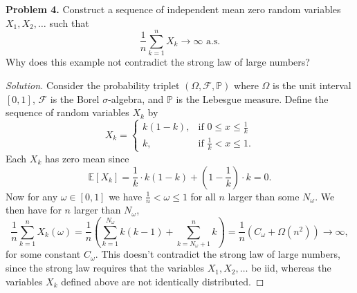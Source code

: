 \documentclass[11pt,letterpaper]{report}
\newcommand{\mcal}[1]{\mathcal{#1}}
\newcommand{\E}{\mathbb{E}}
\newcommand{\Prob}{\mathbb{P}}
\newenvironment{solution}
{\begin{proof}[Solution]}
{\end{proof}}
\begin{document}
\noindent\textbf{Problem 4. }
Construct a sequence of independent mean zero random variables $X_1, X_2, \ldots$ such that
\[
\frac{1}{n}\sum_{k=1}^nX_k\to \infty\text{ a.s.}
\]
Why does this example not contradict the strong law of large numbers?
\begin{solution}
	Consider the probability triplet $(\Omega, \mcal{F}, \Prob)$ where $\Omega$ is the unit interval $[0,1]$, $\mcal{F}$ is the Borel $\sigma$-algebra, and $\Prob$ is the Lebesgue measure. Define the sequence of random variables $X_k$ by
	\[
	X_k = \begin{cases}
		k(1-k),&\text{if }0\leq x\leq \frac{1}{k}\\
		k,&\text{if }\frac{1}{k}<x\leq 1.
	\end{cases}
	\]
	Each $X_k$ has zero mean since
	\[
	\E[X_k] = \frac{1}{k}\cdot k(1-k) + \left(1 - \frac{1}{k}\right)\cdot k = 0.
	\]
	Now for any $\omega\in [0,1]$ we have $\frac{1}{n}< \omega \leq 1$ for all $n$ larger than some $N_\omega$. We then have for $n$ larger than $N_\omega$,
	\[
	\frac{1}{n}\sum_{k=1}^n X_k(\omega) = \frac{1}{n}\left(\sum_{k=1}^{N_\omega}k(k-1) + \sum_{k=N_\omega+1}^nk\right) = \frac{1}{n}(C_\omega + \Omega(n^2)) \to \infty,
	\]
	for some constant $C_\omega$. This doesn't contradict the strong law of large numbers, since the strong law requires that the variables $X_1, X_2, \ldots$ be iid, whereas the variables $X_k$ defined above are not identically distributed.
\end{solution}
\end{document}
